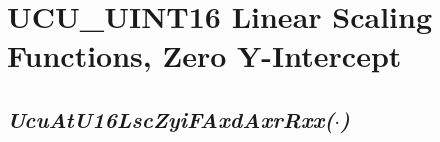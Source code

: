 %
%
%
%
%
%
\section{UCU\_UINT16 Linear Scaling Functions, Zero Y-Intercept}
\label{cafn0:slsf0}


\subsection[\emph{UcuAtU16LscZyiFAxdAxrRxx(\protect\mbox{\protect$\cdot$})}]
           {\emph{UcuAtU16LscZyiFAxdAxrRxx(\protect\mbox{\protect\boldmath $\cdot$})}}
\label{cafn0:slsf0:sfaa0}

